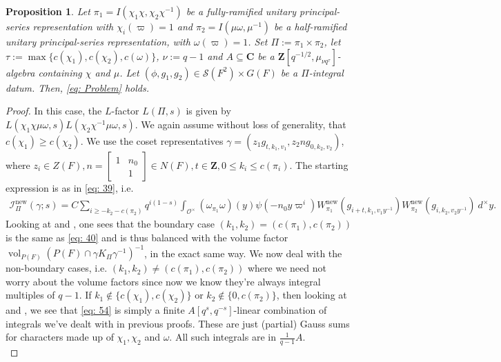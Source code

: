 \documentclass{amsart}
\theoremstyle{plain}
\newtheorem{prop}[thm]{Proposition}
\theoremstyle{plain}
\theoremstyle{remark}
\DeclareMathOperator{\vol}{vol}
\begin{document}
\begin{prop}\label{thm full ram p-s x half ram p-s}
    Let $\pi_1=I(\chi_1\chi,\chi_2\chi^{-1})$ be a fully-ramified unitary principal-series representation with $\chi_i(\varpi)=1$ and $\pi_2=I(\mu\omega,\mu^{-1})$ be a half-ramified unitary principal-series representation, with $\omega(\varpi)=1$. Set $\Pi:=\pi_1\times\pi_2$, let $\tau:=\max\{c(\chi_1),c(\chi_2),c(\omega)\}$, $\nu:=q-1$ and $A\subseteq\mathbf{C}$ be a $\mathbf{Z}[q^{-1/2},\mu_{\nu q^\tau}]$-algebra containing $\chi$ and $\mu$. Let $(\phi,g_1,g_2)\in \mathcal{S}(F^2)\times G(F)$ be a $\Pi$-integral datum. Then, \eqref{eq: Problem} holds.
\end{prop} 
\begin{proof}
    In this case, the $L$-factor $L(\Pi,s)$ is given by $L(\chi_1\chi\mu\omega,s)L(\chi_2\chi^{-1}\mu\omega,s)$. We again assume without loss of generality, that $c(\chi_1)\geq c(\chi_2).$ We use the coset representatives $\gamma=(z_1g_{t,k_1,v_1},z_2ng_{0,k_2,v_2})$, where $z_i\in Z(F),n=\left[\begin{smallmatrix}
            1 & n_0\\
            & 1
        \end{smallmatrix}\right]\in N(F),t\in\mathbf{Z}, 0\leq k_i\leq c(\pi_i)$. The starting expression is as in \eqref{eq: 39}, i.e.
        \begin{align}\label{eq: 54}
            {\mathcal{I}_{\Pi}^\mathrm{new}(\gamma;s)=C\sum_{i\geq -k_2-c(\pi_2)}q^{i(1-s)}\int_{\mathcal{O}^\times}(\omega_{\pi_1}\omega)(y)\psi(-n_0y\varpi^i)W_{\pi_1}^\mathrm{new}(g_{i+t,k_1,v_1y^{-1}})W_{\pi_2}^\mathrm{new}(g_{i,k_2,v_2y^{-1}})\ d^\times y}.
        \end{align}
        Looking at  and \cite[Lemma $3.6$ \& Lemma $3.5$]{Assing_2018}, one sees that the boundary case $(k_1,k_2)=(c(\pi_1),c(\pi_2))$ is the same as \eqref{eq: 40} and is thus balanced with the volume factor $\vol_{P(F)}(P(F)\cap \gamma K_\Pi\gamma^{-1})^{-1}$, in the exact same way. We now deal with the non-boundary cases, i.e. $(k_1,k_2)\neq (c(\pi_1),c(\pi_2))$ where we need not worry about the volume factors since now we know they're always integral multiples of $q-1$. If $k_1\notin \{c(\chi_1),c(\chi_2)\}$ or $k_2\notin\{0,c(\pi_2)\}$, then looking at  and \cite[Lemma $3.5$ \& Lemma $3.6$]{Assing_2018}, we see that \eqref{eq: 54} is simply a finite $A[q^s,q^{-s}]$-linear combination of integrals we've dealt with in previous proofs. These are just (partial) Gauss sums for characters made up of $\chi_1,\chi_2$ and $\omega$. All such integrals are in $\tfrac{1}{q-1}A$.\\ 

\end{proof}
\end{document}
